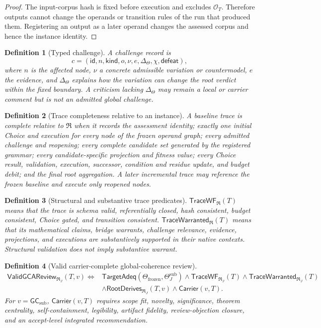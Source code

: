 \documentclass[10pt]{article}
\newtheorem{definition}{Definition}[section]
\newcommand{\TraceWF}{\mathsf{TraceWF}}
\newcommand{\TraceW}{\mathsf{TraceWarranted}}
\newcommand{\ValidReview}{\mathsf{ValidGCAReview}}
\newcommand{\Target}{\Theta}
\newcommand{\GCsub}{\mathsf{GC}_{\mathrm{sub}}}
\newcommand{\Carrier}{\mathsf{Carrier}}
\newcommand{\TargetAdeq}{\mathsf{TargetAdeq}}
\newcommand{\RootDerives}{\mathsf{RootDerives}}
\begin{document}
\begin{proof}
The input-corpus hash is fixed before execution and excludes $\mathcal O_T$.  Therefore outputs cannot change the operands or transition rules of the run that produced them.  Registering an output as a later operand changes the assessed corpus and hence the instance identity.
\end{proof}

\begin{definition}[Typed challenge]
A challenge record is
\[
  c=(\mathsf{id},n,\mathsf{kind},o,\nu,e,
  \Delta_\Target,\chi,\mathsf{defeat}),
\]
where $n$ is the affected node, $\nu$ a concrete admissible variation or countermodel, $e$ the evidence, and $\Delta_\Target$ explains how the variation can change the root verdict within the fixed boundary.  A criticism lacking $\Delta_\Target$ may remain a local or carrier comment but is not an admitted global challenge.
\end{definition}

\begin{definition}[Trace completeness relative to an instance]
A baseline trace is complete relative to $\mathfrak R$ when it records the assessment identity; exactly one initial Choice and execution for every node of the frozen operand graph; every admitted challenge and reopening; every complete candidate set generated by the registered grammar; every candidate-specific projection and fitness value; every Choice result, validation, execution, successor, condition and residue update, and budget debit; and the final root aggregation.  A later incremental trace may reference the frozen baseline and execute only reopened nodes.
\end{definition}

\begin{definition}[Structural and substantive trace predicates]
$\TraceWF_{\mathfrak R}(T)$ means that the trace is schema valid, referentially closed, hash consistent, budget consistent, Choice gated, and transition consistent.  $\TraceW_{\mathfrak R}(T)$ means that its mathematical claims, bridge warrants, challenge relevance, evidence, projections, and executions are substantively supported in their native contexts.  Structural validation does not imply substantive warrant.
\end{definition}

\begin{definition}[Valid carrier-complete global-coherence review]
\[
\begin{aligned}
  \ValidReview_{\mathfrak R_J}(T,v)
  \Longleftrightarrow{}&
  \TargetAdeq(\Target_{\mathrm{frozen}},\Target_J^{\mathrm{sub}})\land
  \TraceWF_{\mathfrak R_J}(T)\land
  \TraceW_{\mathfrak R_J}(T)\\
  &\land\RootDerives_{\mathfrak R_J}(T,v)
  \land\Carrier(v,T).
\end{aligned}
\]
For $v=\GCsub$, $\Carrier(v,T)$ requires scope fit, novelty, significance, theorem centrality, self-containment, legibility, artifact fidelity, review-objection closure, and an accept-level integrated recommendation.
\end{definition}
\end{document}
